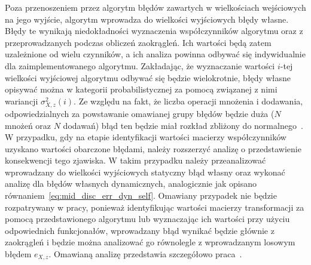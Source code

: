 Poza przenoszeniem przez algorytm błędów zawartych w wielkościach wejściowych na jego wyjście, algorytm wprowadza do wielkości wyjściowych błędy własne. Błędy te wynikają niedokładności wyznaczenia współczynników algorytmu oraz z przeprowadzanych podczas obliczeń zaokrągleń. Ich wartości będą zatem uzależnione od wielu czynników, a ich analiza powinna odbywać się indywidualnie dla zaimplementowanego algorytmu. Zakładając, że wyznaczanie wartości $i$-tej wielkości wyjściowej algorytmu odbywać się będzie wielokrotnie, błędy własne opisywać można w kategorii probabilistycznej za pomocą związanej z nimi wariancji $\sigma_{X,z}^{2}(i)$. Ze względu na fakt, że liczba operacji mnożenia i dodawania, odpowiedzialnych za powstawanie omawianej grupy błędów będzie duża ($N$ mnożeń oraz $N$ dodawań) błąd ten będzie miał rozkład zbliżony do normalnego~\cite{jcgm_guide}. W przypadku, gdy na etapie identyfikacji wartości macierzy współczynników uzyskano wartości obarczone błędami, należy rozszerzyć analizę o przedstawienie konsekwencji tego zjawiska. W takim przypadku należy przeanalizować wprowadzany do wielkości wyjściowych statyczny błąd własny oraz wykonać analizę dla błędów własnych dynamicznych, analogicznie jak opisano równaniem~\eqref{eq:mid_disc_err_dyn_self}. Omawiany przypadek nie będzie rozpatrywany w pracy, ponieważ identyfikując wartości macierzy transformacji za pomocą przedstawionego algorytmu lub wyznaczając ich wartości przy użyciu odpowiednich funkcjonałów, wprowadzany błąd wynikać będzie głównie z zaokrągleń i będzie można analizować go równolegle z wprowadzanym losowym błędem $e_{X,z}$. Omawianą analizę przedstawia szczegółowo praca~\cite{jakubiec_system}.

